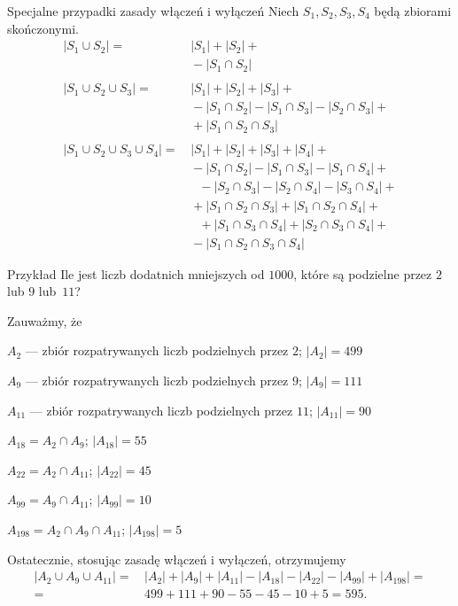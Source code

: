 \documentclass[a4paper,10pt]{beamer}
\begin{document}
\begin{frame}

\begin{block}{Specjalne przypadki zasady włączeń i wyłączeń}
Niech $S_1,S_2,S_3,S_4$ będą zbiorami skończonymi.
\begin{align*}
|S_1\cup S_2|=&\,|S_1|+|S_2|+\\
&\,-|S_1\cap S_2|\\
\\
|S_1\cup S_2\cup S_3|=&\,|S_1|+|S_2|+|S_3|+\\
&\,-|S_1\cap S_2|-|S_1\cap S_3|-|S_2\cap S_3|+\\
&\,+|S_1\cap S_2\cap S_3|\\
\\
|S_1\cup S_2\cup S_3\cup S_4|=&\,|S_1|+|S_2|+|S_3|+|S_4|+\\
&\,-|S_1\cap S_2|-|S_1\cap S_3|-|S_1\cap S_4|+\\
&\,\ \ \ -|S_2\cap S_3|-|S_2\cap S_4|-|S_3\cap S_4|+\\
&\,+|S_1\cap S_2\cap S_3|+|S_1\cap S_2\cap S_4|+\\
&\,\ \ \ +|S_1\cap S_3\cap S_4|+|S_2\cap S_3\cap S_4|+\\
&\,-|S_1\cap S_2\cap S_3\cap S_4|
\end{align*}
\end{block}

\end{frame}


\begin{frame}

\begin{exampleblock}{Przykład}
Ile jest liczb dodatnich mniejszych od $1000$, które są podzielne przez $2$ lub $9$ lub~$11$?

\bigskip
Zauważmy, że

\medskip

$A_2$ --- zbiór rozpatrywanych liczb podzielnych przez $2$; $|A_2|=499$

$A_9$ --- zbiór rozpatrywanych liczb podzielnych przez $9$; $|A_9|=111$

$A_{11}$ --- zbiór rozpatrywanych liczb podzielnych przez $11$; $|A_{11}|=90$

\medskip

$A_{18}=A_2\cap A_9$; $|A_{18}|=55$

$A_{22}=A_2\cap A_{11}$; $|A_{22}|=45$

$A_{99}=A_9\cap A_{11}$; $|A_{99}|=10$

\medskip

$A_{198}=A_2\cap A_9\cap A_{11}$; $|A_{198}|=5$

\medskip

Ostatecznie, stosując zasadę włączeń i wyłączeń, otrzymujemy
\begin{align*}
|A_2\cup A_9\cup A_{11}|=&\,|A_2|+|A_9|+|A_{11}|-|A_{18}|-|A_{22}|-|A_{99}|+|A_{198}|=\\
=&\,499+111+90-55-45-10+5=595.
\end{align*}
\end{exampleblock}

\end{frame}
\end{document}
